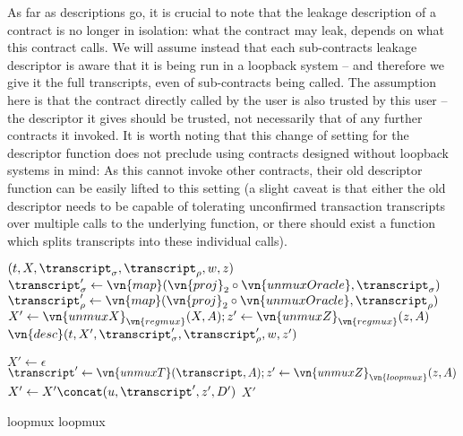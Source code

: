 \fussy
As far as descriptions go, it is crucial to note that the leakage description of
a contract is no longer in isolation: what the contract may leak, depends on
what this contract calls. We will assume instead that each sub-contracts leakage
descriptor is aware that it is being run in a loopback system -- and therefore
we give it the full transcripts, even of sub-contracts being called. The
assumption here is that the contract directly called by the user is also trusted
by this user -- the descriptor it gives should be trusted, not necessarily that
of any further contracts it invoked. It is worth noting that this change of
setting for the descriptor function does not preclude using contracts designed
without loopback systems in mind: As this cannot invoke other contracts, their
old descriptor function can be easily lifted to this setting (a slight caveat is that either the old descriptor needs to
be capable of tolerating unconfirmed transaction transcripts over multiple calls
to the underlying function, or there should exist a function which splits
transcripts into these individual calls).

\begin{algorithmic}
  $(t, X, \transcript_\sigma, \transcript_\rho, w, z)$
    \State \Let $\transcript_\sigma' \gets \vn{map}(\vn{proj}_2 \circ
      \vn{unmuxOracle}, \transcript_\sigma)$
    \State \Let $\transcript_\rho' \gets \vn{map}(\vn{proj}_2 \circ
      \vn{unmuxOracle}, \transcript_\rho)$
    \State \Let $X' \gets \vn{unmuxX}_{\vn{regmux}}(X, A); z' \gets
      \vn{unmuxZ}_{\vn{regmux}}(z, A)$
    \State \Return $\vn{desc}(t, X', \transcript_\sigma', \transcript_\rho', w, z')$
  \EndFunction
\end{algorithmic}
\begin{algorithmic}
  \EndFunction
\end{algorithmic}
\begin{algorithmic}
    \State \Let $X' \gets \epsilon$
      \State \Let $\transcript' \gets \vn{unmuxT}(\transcript, A); z' \gets \vn{unmuxZ}_{\vn{loopmux}}(z, A)$
      \State \Let $X' \gets X' \concat (u, \transcript', z', D')$
    \EndFor
    \State \Return $X'$
  \EndFunction
\end{algorithmic}
{loopmux}
{loopmux}

